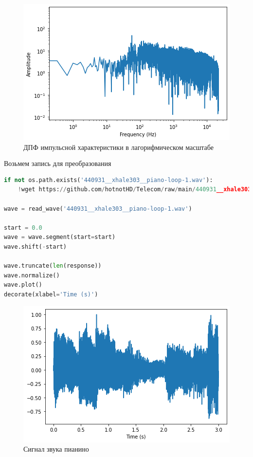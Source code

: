 \begin{figure}[H]
	\begin{center}
		\includegraphics[scale=1]{fig/lab10/lab10_07.png}
		\caption{ДПФ импульсной характеристики в лагорифмическом масштабе} 
	\end{center}
\end{figure}

Возьмем запись для преобразования

\begin{lstlisting}[language=Python]
if not os.path.exists('440931__xhale303__piano-loop-1.wav'):
    !wget https://github.com/hotnotHD/Telecom/raw/main/440931__xhale303__piano-loop-1.wav
    
wave = read_wave('440931__xhale303__piano-loop-1.wav')

start = 0.0
wave = wave.segment(start=start)
wave.shift(-start)

wave.truncate(len(response))
wave.normalize()
wave.plot()
decorate(xlabel='Time (s)')
\end{lstlisting}

\begin{figure}[H]
	\begin{center}
		\includegraphics[scale=1]{fig/lab10/lab10_08.png}
		\caption{Сигнал звука пианино}
	\end{center}
\end{figure}

